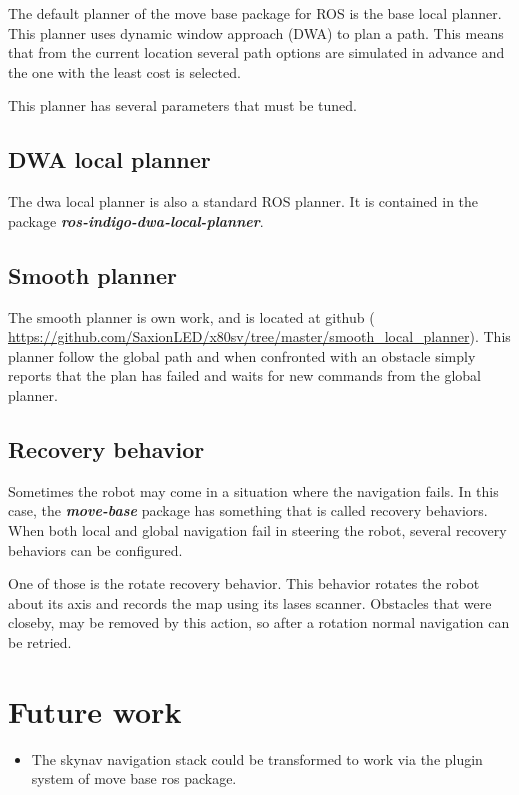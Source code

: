 \documentclass[a4paper]{article}
\newcommand{\rospackage}[1]{\textbf{\textit{#1}}}
\begin{document}
The default planner of the move base package for ROS is the base local planner.
This planner uses dynamic window approach (DWA) to plan a path. This means that from the current 
location several path options are simulated in advance and the one with the least cost is selected.

This planner has several parameters that must be tuned.



\subsection{DWA local planner}
The dwa local planner is also a standard ROS planner. It is contained in the package
\rospackage{ros-indigo-dwa-local-planner}.

\subsection{Smooth planner}
The smooth planner is own work, and is located at github (
\url{https://github.com/SaxionLED/x80sv/tree/master/smooth_local_planner}).
This planner follow the global path and when confronted with an obstacle simply
reports that the plan has failed and waits for new commands from the global planner.

\subsection{Recovery behavior}
Sometimes the robot may come in a situation where the navigation fails. In this case, the 
\rospackage{move-base} package
has something that is called recovery behaviors. When both local and global navigation fail in
steering the robot, several recovery behaviors can be configured.

One of those is the rotate
recovery behavior. This behavior rotates the robot about its axis and records the map using its lases
scanner. Obstacles that were closeby, may be removed by this action, so after a rotation normal navigation
can be retried.

\section{Future work}

\begin{itemize}
  \item The skynav navigation stack could be transformed to work via the plugin system of move base ros package.
\end{itemize}
\end{document}
